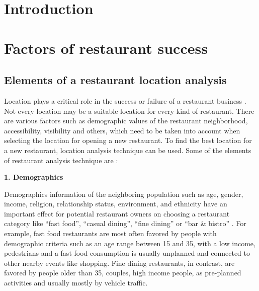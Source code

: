 \documentclass[a4paper, 11pt, oneside]{Thesis}  %
\begin{document}



\mainmatter	  %
\pagestyle{fancy}  %


\chapter{Introduction}

\chapter{Factors of restaurant success}

\section{Elements of a restaurant location analysis}
\label{elements}


Location plays a critical role in the success or failure of a restaurant business \cite{Tzeng.2002} \cite{Parsa.2005} \cite{Camillo.2008}. Not every location may be a suitable location for every kind of restaurant. There are various factors such as demographic values of the restaurant neighborhood, accessibility, visibility and others, which need to be taken into account when selecting the location for opening a new restaurant. To find the best location for a new restaurant, location analysis technique can be used. Some of the elements of restaurant analysis technique are \cite{EvanTarver.21.04.2017} \cite{Webstaurantstore.com.25.07.2018}:


 \textbf{1.	Demographics}

Demographics information of the neighboring population such as age, gender, income, religion, relationship status, environment, and ethnicity have an important effect for potential restaurant owners on choosing a restaurant category like “fast food”, “casual dining”, “fine dining” or “bar \& bistro” \cite{EvanTarver.21.04.2017}. For example, fast food restaurants are most often favored by people with demographic criteria such as an age range between 15 and 35, with a low income, pedestrians and a fast food consumption is usually unplanned and connected to other nearby events like shopping. Fine dining restaurants, in contrast, are favored by people older than 35, couples, high income people, as pre-planned activities and usually mostly by vehicle traffic.
\end{document}
